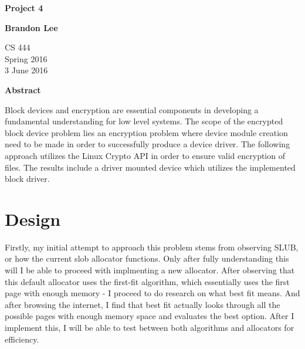 \documentclass[letterpaper,10pt,titlepage]{article}
\begin{document}
\begin{titlepage}
    \begin{center}
        \vspace*{3.5cm}

        \textbf{Project 4}

        \vspace{0.5cm}

        \textbf{Brandon Lee}

        \vspace{0.8cm}

        CS 444\\
        Spring 2016\\
        3 June 2016\\

        \vspace{1cm}

        \textbf{Abstract}\\

        \vspace{0.5cm}

        Block devices and encryption are essential components in developing a fundamental understanding for low level systems.  The scope of the encrypted block device problem lies an encryption problem where device module creation need to be made in order to successfully produce a device driver.  The following approach utilizes the Linux Crypto API in order to ensure valid encryption of files.  The results include a driver mounted device which utilizes the implemented block driver.


        \vfill



    \end{center}
\end{titlepage}

\newpage

\section{Design}

Firstly, my initial attempt to approach this problem stems from observing SLUB, or how the current slob allocator functions. Only after fully understanding this will I be able to proceed with implmenting a new allocator. After observing that this default allocator uses the first-fit algorithm, which essentially uses the first page with enough memory - I proceed to do research on what best fit means. And after browsing the internet, I find that best fit actually looks through all the
possible pages with enough memory space and evaluates the best option. After I implement this, I will be able to test between both algorithms and allocators for efficiency.
\end{document}
